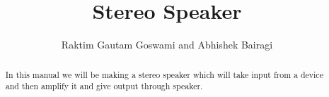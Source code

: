\documentclass[journal,12pt,twocolumn]{IEEEtran}
\begin{document}
\let\StandardTheFigure\thefigure
\renewcommand{\thefigure}{\theproblem}



\makeatletter
{}
\makeatother

\let\StandardTheFigure\thefigure
\let\StandardTheTable\thetable





\def\putbox#1#2#3{\makebox[0in][l]{\makebox[#1][l]{}\raisebox{\baselineskip}[0in][0in]{\raisebox{#2}[0in][0in]{#3}}}}
     \def\rightbox#1{\makebox[0in][r]{#1}}
     \def\centbox#1{\makebox[0in]{#1}}
     \def\topbox#1{\raisebox{-\baselineskip}[0in][0in]{#1}}
     \def\midbox#1{\raisebox{-0.5\baselineskip}[0in][0in]{#1}}

\vspace{3cm}

\title{ 
	{
Stereo Speaker
	}
}

\author{Raktim Gautam Goswami and Abhishek Bairagi%
	
	
}	

\maketitle

\tableofcontents
\bigskip

\begin{abstract}
	
	In this manual we will be making a stereo speaker which will take input from a device and then amplify it and give output through speaker.
	
\end{abstract}

\end{document}
